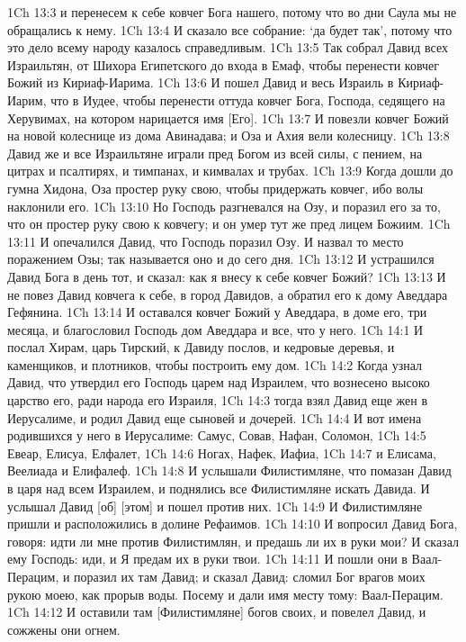 1Ch 13:3  и перенесем к себе ковчег Бога нашего, потому что во дни Саула мы не обращались к нему.
1Ch 13:4  И сказало все собрание: `да будет так', потому что это дело всему народу казалось справедливым.
1Ch 13:5  Так собрал Давид всех Израильтян, от Шихора Египетского до входа в Емаф, чтобы перенести ковчег Божий из Кириаф-Иарима.
1Ch 13:6  И пошел Давид и весь Израиль в Кириаф-Иарим, что в Иудее, чтобы перенести оттуда ковчег Бога, Господа, седящего на Херувимах, на котором нарицается имя [Его].
1Ch 13:7  И повезли ковчег Божий на новой колеснице из дома Авинадава; и Оза и Ахия вели колесницу.
1Ch 13:8  Давид же и все Израильтяне играли пред Богом из всей силы, с пением, на цитрах и псалтирях, и тимпанах, и кимвалах и трубах.
1Ch 13:9  Когда дошли до гумна Хидона, Оза простер руку свою, чтобы придержать ковчег, ибо волы наклонили его.
1Ch 13:10  Но Господь разгневался на Озу, и поразил его за то, что он простер руку свою к ковчегу; и он умер тут же пред лицем Божиим.
1Ch 13:11  И опечалился Давид, что Господь поразил Озу. И назвал то место поражением Озы; так называется оно и до сего дня.
1Ch 13:12  И устрашился Давид Бога в день тот, и сказал: как я внесу к себе ковчег Божий?
1Ch 13:13  И не повез Давид ковчега к себе, в город Давидов, а обратил его к дому Аведдара Гефянина.
1Ch 13:14  И оставался ковчег Божий у Аведдара, в доме его, три месяца, и благословил Господь дом Аведдара и все, что у него.
1Ch 14:1  И послал Хирам, царь Тирский, к Давиду послов, и кедровые деревья, и каменщиков, и плотников, чтобы построить ему дом.
1Ch 14:2  Когда узнал Давид, что утвердил его Господь царем над Израилем, что вознесено высоко царство его, ради народа его Израиля,
1Ch 14:3  тогда взял Давид еще жен в Иерусалиме, и родил Давид еще сыновей и дочерей.
1Ch 14:4  И вот имена родившихся у него в Иерусалиме: Самус, Совав, Нафан, Соломон,
1Ch 14:5  Евеар, Елисуа, Елфалет,
1Ch 14:6  Ногах, Нафек, Иафиа,
1Ch 14:7  и Елисама, Веелиада и Елифалеф.
1Ch 14:8  И услышали Филистимляне, что помазан Давид в царя над всем Израилем, и поднялись все Филистимляне искать Давида. И услышал Давид [об] [этом] и пошел против них.
1Ch 14:9  И Филистимляне пришли и расположились в долине Рефаимов.
1Ch 14:10  И вопросил Давид Бога, говоря: идти ли мне против Филистимлян, и предашь ли их в руки мои? И сказал ему Господь: иди, и Я предам их в руки твои.
1Ch 14:11  И пошли они в Ваал-Перацим, и поразил их там Давид; и сказал Давид: сломил Бог врагов моих рукою моею, как прорыв воды. Посему и дали имя месту тому: Ваал-Перацим.
1Ch 14:12  И оставили там [Филистимляне] богов своих, и повелел Давид, и сожжены они огнем.
